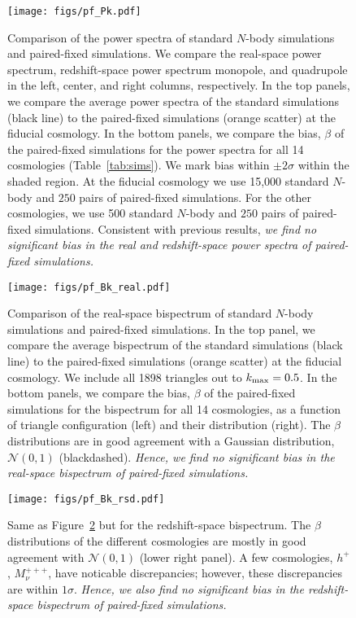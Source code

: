 \begin{figure}
\begin{center}
    \texttt{[image: figs/pf\_Pk.pdf]} 
    \caption{Comparison of the power spectra of standard $N$-body simulations 
    and paired-fixed simulations. We compare the real-space power spectrum, 
    redshift-space power spectrum monopole, and quadrupole in the left, center, 
    and right columns, respectively. In the top panels, we compare the average 
    power spectra of the standard simulations (black line) to the paired-fixed
    simulations (orange scatter) at the fiducial cosmology. In the bottom panels, 
    we compare the bias, $\beta$ of the paired-fixed simulations for the power 
    spectra for all 14 cosmologies (Table~\ref{tab:sims}). We mark bias within 
    $\pm2\sigma$ within the shaded region. At the fiducial 
    cosmology we use 15,000 standard $N$-body and $250$ pairs of paired-fixed 
    simulations. For the other cosmologies, we use 500 standard $N$-body and $250$ pairs 
    of paired-fixed simulations. Consistent with previous results, {\em we find no
    significant bias in the real and redshift-space power spectra of paired-fixed
    simulations.}
    }
\label{fig:pk_real}
\end{center}
\end{figure}


\begin{figure}
\begin{center}
    \texttt{[image: figs/pf\_Bk\_real.pdf]} 
    \caption{Comparison of the real-space bispectrum of standard $N$-body simulations 
    and paired-fixed simulations. In the top panel, we compare the average 
    bispectrum of the standard simulations (black line) to the paired-fixed
    simulations (orange scatter) at the fiducial cosmology. We include all 
    1898 triangles out to $k_{\rm max} = 0.5$. In the bottom panels, we 
    compare the bias, $\beta$ of the paired-fixed simulations for the bispectrum 
    for all 14 cosmologies, as a function of triangle configuration (left) 
    and their distribution (right). The $\beta$ distributions are in good 
    agreement with a Gaussian distribution, $\mathcal{N}(0,1)$ (blackdashed). 
    {\em Hence, we find no significant bias in the real-space bispectrum of 
    paired-fixed simulations.}
}
\label{fig:bk_real}
\end{center}
\end{figure}

\begin{figure}
\begin{center}
    \texttt{[image: figs/pf\_Bk\_rsd.pdf]} 
    \caption{Same as Figure~\ref{fig:bk_real} but for the redshift-space bispectrum.
    The $\beta$ distributions of the different cosmologies are mostly in good 
    agreement with $\mathcal{N}(0,1)$ (lower right panel). A few cosmologies, 
    $h^+$, $M_\nu^{+++}$, have noticable discrepancies; however, these 
    discrepancies are within $1\sigma$. {\em Hence, we also find no significant 
    bias in the redshift-space bispectrum of paired-fixed simulations.}
    }
\label{fig:bk_rsd}
\end{center}
\end{figure}


